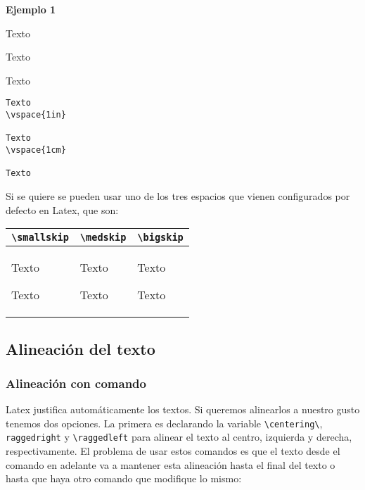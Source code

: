 	\textbf{Ejemplo 1}
	
	\begin{minipage}{\textwidth}
		Texto
		\vspace{1in}
		
		Texto
		\vspace{1cm}
				
		Texto
	\end{minipage}	
	\begin{myquote}
		\begin{lstlisting}
Texto
\vspace{1in}

Texto
\vspace{1cm}
		
Texto
		\end{lstlisting}
	\end{myquote}
	
	
	Si se quiere se pueden usar uno de los tres espacios que vienen configurados por defecto en Latex, que son:
	
	\begin{center}
		\begin{tabularx}{300pt}{|X|X|X|}
			\hline
			\verb|\smallskip| & \verb|\medskip| & \verb|\bigskip|\\
			\hline
			Texto 
			\smallskip 
			
			Texto & Texto 
			\medskip 
			
			Texto & Texto 
			\bigskip 
			
			Texto\\
			\hline
		\end{tabularx}
	\end{center} 

	\subsection{Alineación del texto}
	
	\subsubsection{Alineación con comando}
	
	Latex justifica automáticamente los textos. Si queremos alinearlos a nuestro gusto tenemos dos opciones. La primera es declarando la variable \verb|\centering\|, \verb|raggedright| y \verb|\raggedleft| para alinear el texto al centro, izquierda y derecha, respectivamente. El problema de usar estos comandos es que el texto desde el comando en adelante va a mantener esta alineación hasta el final del texto o hasta que haya otro comando que modifique lo mismo:
	
